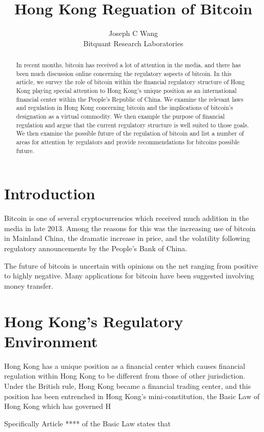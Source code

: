 \title{Hong Kong Reguation of Bitcoin}
\author{Joseph C Wang\\
\small Bitquant Research Laboratories
}

\begin{abstract}
In recent months, bitcoin has received a lot of attention in the
media, and there has been much discussion online concerning the
regulatory aspects of bitcoin.  In this article, we survey the role of
bitcoin within the financial regulatory structure of Hong Kong playing
special attention to Hong Kong's unique position as an international
financial center within the People's Republic of China.  We examine
the relevant laws and regulation in Hong Kong concerning bitcoin and
the implications of bitcoin's designation as a virtual commodity.  We
then example the purpose of financial regulation and argue that the
current regulatory structure is well suited to those goals.  We then
examine the possible future of the regulation of bitcoin and list a
number of areas for attention by regulators and provide
recommendations for bitcoins possible future.
\end{abstract}

\section{Introduction}

Bitcoin is one of several cryptocurrencies which received much
addition in the media in late 2013.  Among the reasons for this was
the increasing use of bitcoin in Mainland China, the dramatic increase
in price, and the volatility following regulatory announcements by the
People's Bank of China.

The future of bitcoin is uncertain with opinions on the net ranging
from positive to highly negative.  Many applications for bitcoin have
been suggested involving money transfer.

\section{Hong Kong's Regulatory Environment}
Hong Kong has a unique position as a financial center which causes
financial regulation within Hong Kong to be different from those of
other jurisdiction.  Under the British rule, Hong Kong became a
financial trading center, and this position has been entrenched in
Hong Kong's mini-constitution, the Basic Law of Hong Kong which has
governed H

Specifically Article **** of the Basic Law states that

